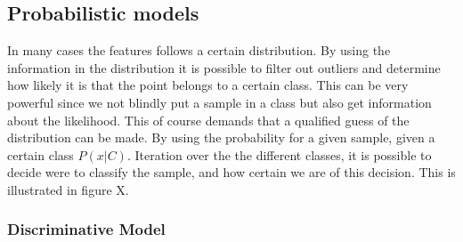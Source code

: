 \subsection{Probabilistic models}
In many cases the features follows a certain distribution. By using the information in the distribution it is possible to filter out outliers and determine how likely it is that the point belongs to a certain class. This can be very powerful since we not blindly put a sample in a class but also get information about the likelihood. This of course demands that a qualified guess of the distribution can be made. 
By using the probability for a given sample, given a certain class $P(x|C)$. Iteration over the the different classes, it is possible to decide were to classify the sample, and how certain we are of this decision. This is illustrated in figure X. 



\subsubsection{Discriminative Model}

